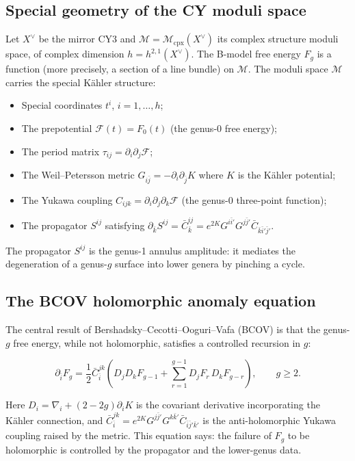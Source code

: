 \documentclass[11pt]{amsart}
\theoremstyle{plain}
\theoremstyle{definition}
\theoremstyle{remark}
\newcommand{\cM}{\mathcal{M}}
\newcommand{\cF}{\mathcal{F}}
\begin{document}
\subsection{Special geometry of the CY moduli space}
\label{sub:special-geometry}

Let $X^\vee$ be the mirror CY3 and $\cM = \cM_{\mathrm{cpx}}(X^\vee)$ its
complex structure moduli space, of complex dimension $h = h^{2,1}(X^\vee)$.
The B-model free energy $F_g$ is a function (more precisely, a section of a
line bundle) on $\cM$. The moduli space $\cM$ carries the special K\"ahler
structure:
\begin{itemize}
 \item Special coordinates $t^i$, $i = 1, \ldots, h$;
 \item The prepotential $\cF(t) = F_0(t)$ (the genus-0 free energy);
 \item The period matrix $\tau_{ij} = \partial_i \partial_j \cF$;
 \item The Weil--Petersson metric $G_{i\bar{j}} = -\partial_i \partial_{\bar{j}} K$
 where $K$ is the K\"ahler potential;
 \item The Yukawa coupling $C_{ijk} = \partial_i \partial_j \partial_k \cF$
 (the genus-0 three-point function);
 \item The propagator $S^{ij}$ satisfying $\partial_{\bar{k}} S^{ij} = \bar{C}^{ij}_{\bar{k}} = e^{2K} G^{i\bar{i}'} G^{j\bar{j}'} \bar{C}_{\bar{k}\bar{i}'\bar{j}'}$.
\end{itemize}
The propagator $S^{ij}$ is the genus-1 annulus amplitude: it mediates the
degeneration of a genus-$g$ surface into lower genera by pinching a cycle.

\subsection{The BCOV holomorphic anomaly equation}
\label{sub:bcov}

The central result of Bershadsky--Cecotti--Ooguri--Vafa (BCOV) is that the
genus-$g$ free energy, while not holomorphic, satisfies a controlled
recursion in $g$:

\begin{equation}\label{eq:bcov}
 \partial_{\bar{i}} F_g = \frac{1}{2} \bar{C}^{jk}_{\bar{i}}
 \left( D_j D_k F_{g-1} + \sum_{r=1}^{g-1} D_j F_r\, D_k F_{g-r} \right),
 \qquad g \geq 2.
\end{equation}

Here $D_i = \nabla_i + (2-2g) \partial_i K$ is the covariant derivative
incorporating the K\"ahler connection, and $\bar{C}^{jk}_{\bar{i}} =
e^{2K} G^{j\bar{j}'} G^{k\bar{k}'} \bar{C}_{\bar{i}\bar{j}'\bar{k}'}$
is the anti-holomorphic Yukawa coupling raised by the metric. This equation
says: the failure of $F_g$ to be holomorphic is controlled by the
propagator and the lower-genus data.
\end{document}
